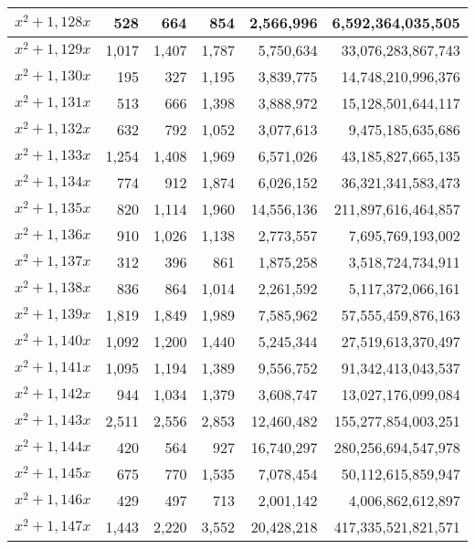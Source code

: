 \documentclass[a4paper]{amsproc}
\theoremstyle{plain}
\begin{document}
\begin{longtable}{ | l | r | r | r | r | r | }
$x^2 + 1{,}128x$ & 528 & 664 & 854 & 2{,}566{,}996 & 6{,}592{,}364{,}035{,}505 \\ \hline
$x^2 + 1{,}129x$ & 1{,}017 & 1{,}407 & 1{,}787 & 5{,}750{,}634 & 33{,}076{,}283{,}867{,}743 \\ \hline
$x^2 + 1{,}130x$ & 195 & 327 & 1{,}195 & 3{,}839{,}775 & 14{,}748{,}210{,}996{,}376 \\ \hline
$x^2 + 1{,}131x$ & 513 & 666 & 1{,}398 & 3{,}888{,}972 & 15{,}128{,}501{,}644{,}117 \\ \hline
$x^2 + 1{,}132x$ & 632 & 792 & 1{,}052 & 3{,}077{,}613 & 9{,}475{,}185{,}635{,}686 \\ \hline
$x^2 + 1{,}133x$ & 1{,}254 & 1{,}408 & 1{,}969 & 6{,}571{,}026 & 43{,}185{,}827{,}665{,}135 \\ \hline
$x^2 + 1{,}134x$ & 774 & 912 & 1{,}874 & 6{,}026{,}152 & 36{,}321{,}341{,}583{,}473 \\ \hline
$x^2 + 1{,}135x$ & 820 & 1{,}114 & 1{,}960 & 14{,}556{,}136 & 211{,}897{,}616{,}464{,}857 \\ \hline
$x^2 + 1{,}136x$ & 910 & 1{,}026 & 1{,}138 & 2{,}773{,}557 & 7{,}695{,}769{,}193{,}002 \\ \hline
$x^2 + 1{,}137x$ & 312 & 396 & 861 & 1{,}875{,}258 & 3{,}518{,}724{,}734{,}911 \\ \hline
$x^2 + 1{,}138x$ & 836 & 864 & 1{,}014 & 2{,}261{,}592 & 5{,}117{,}372{,}066{,}161 \\ \hline
$x^2 + 1{,}139x$ & 1{,}819 & 1{,}849 & 1{,}989 & 7{,}585{,}962 & 57{,}555{,}459{,}876{,}163 \\ \hline
$x^2 + 1{,}140x$ & 1{,}092 & 1{,}200 & 1{,}440 & 5{,}245{,}344 & 27{,}519{,}613{,}370{,}497 \\ \hline
$x^2 + 1{,}141x$ & 1{,}095 & 1{,}194 & 1{,}389 & 9{,}556{,}752 & 91{,}342{,}413{,}043{,}537 \\ \hline
$x^2 + 1{,}142x$ & 944 & 1{,}034 & 1{,}379 & 3{,}608{,}747 & 13{,}027{,}176{,}099{,}084 \\ \hline
$x^2 + 1{,}143x$ & 2{,}511 & 2{,}556 & 2{,}853 & 12{,}460{,}482 & 155{,}277{,}854{,}003{,}251 \\ \hline
$x^2 + 1{,}144x$ & 420 & 564 & 927 & 16{,}740{,}297 & 280{,}256{,}694{,}547{,}978 \\ \hline
$x^2 + 1{,}145x$ & 675 & 770 & 1{,}535 & 7{,}078{,}454 & 50{,}112{,}615{,}859{,}947 \\ \hline
$x^2 + 1{,}146x$ & 429 & 497 & 713 & 2{,}001{,}142 & 4{,}006{,}862{,}612{,}897 \\ \hline
$x^2 + 1{,}147x$ & 1{,}443 & 2{,}220 & 3{,}552 & 20{,}428{,}218 & 417{,}335{,}521{,}821{,}571 \\ \hline

\end{longtable}
\end{document}
